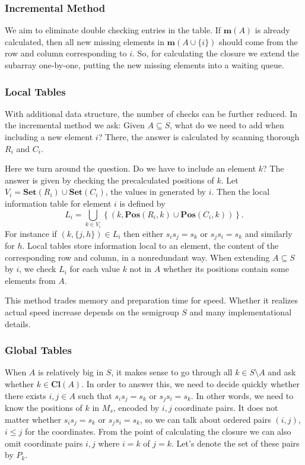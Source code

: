 \documentclass{amsart}
\newcommand{\Set}{\mathbf{Set}}
\newcommand{\Miss}{\mathbf{m}}
\newcommand{\Closure}{\mathbf{Cl}}
\newcommand{\Pos}{\mathbf{Pos}}
\theoremstyle{plain}
\theoremstyle{definition}
\begin{document}
\subsubsection{Incremental Method}
We aim to eliminate double checking entries in the table.
If $\Miss(A)$ is already calculated, then all new missing elements in $\Miss(A\cup\{i\})$ should come from the row and column corresponding to $i$.
So, for calculating the closure we extend the subarray one-by-one, putting the new missing elements into a waiting queue.

\subsubsection{Local Tables}
With additional data structure, the number of checks can be further reduced. 
In the incremental method we ask: Given $A\subseteq S$, what do we need to add when including a new element $i$?
There, the answer is calculated by scanning thorough $R_i$ and $C_i$.

Here we turn around the question.
Do we have to include an element $k$? The answer is given by checking the precalculated positions of $k$. 
Let $V_i=\Set(R_i)\cup\Set(C_i)$, the values in generated by $i$. Then the  local information table for element $i$ is defined by
$$L_i=\bigcup_{k\in V_i}\left\{(k,\Pos(R_i,k)\cup\Pos(C_i,k))\right\}.$$
For instance if $(k,\{j,h\})\in L_i$ then either $s_is_j=s_k$ or $s_js_i=s_k$ and similarly for $h$.
Local tables store information local to an element, the content of the corresponding row and column, in a nonredundant way.
When  extending $A\subseteq S$ by $i$, we check $L_i$ for each value $k$ not in $A$ whether its positions contain some elements from $A$. 

This method trades memory and preparation time for speed. Whether it realizes actual speed increase depends on the semigroup $S$ and many implementational details.

\subsubsection{Global Tables}
When $A$ is relatively big in $S$, it makes sense to go through all $k\in S\setminus A$ and ask whether $k\in\Closure(A)$. 
In order to answer this, we need to decide quickly whether there exists $i,j\in A$ such that $s_is_j=s_k$ or $s_js_i=s_k$.
In other words, we need to know the positions of $k$ in $M_s$, encoded by $i,j$ coordinate pairs.
It does not matter whether $s_is_j=s_k$ or $s_js_i=s_k$, so we can talk about ordered pairs $(i,j)$, $i\leq j$ for the coordinates. 
From the point of calculating the closure we can also omit coordinate pairs $i,j$ where $i=k$ of $j=k$. 
Let's denote the set of these pairs by $P_k$.
\end{document}

